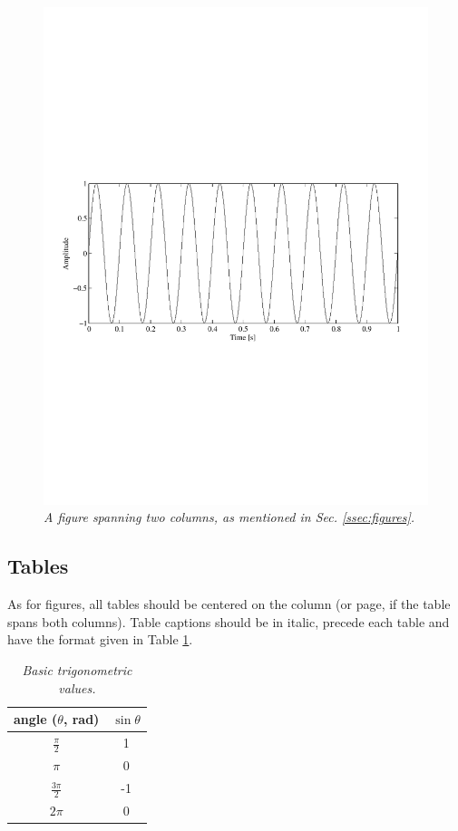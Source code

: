 \documentclass[twoside,a4paper]{article}
\begin{document}
\begin{figure}[ht]
\centerline{\includegraphics[width=5in,bb= 3 257 607 534]{TwoColumnSine2}} %
\caption{\label{ftt_plot2}{\it A figure spanning two columns, as mentioned in Sec. \ref{ssec:figures}. }}
\end{figure} %

\subsection{Tables}
As for figures, all tables should be centered on the column (or page, if the table spans both columns).
Table captions should be in italic, precede each table and have the format given in Table \ref{tab:example}.

\begin{table}[htdp]
  \caption{{\it Basic trigonometric values.}}
  \begin{center}
    \begin{tabular}{|c|c|}\hline
        angle ($\theta$, rad) & $\sin \theta$ \\\hline
    $\frac{\pi}{2}$ & 1 \\
    $\pi$ & 0 \\
    $\frac{3\pi}{2}$ & -1 \\
    $2\pi$ & 0 \\\hline
    \end{tabular}
  \end{center}
  \label{tab:example}
\end{table}
\end{document}
